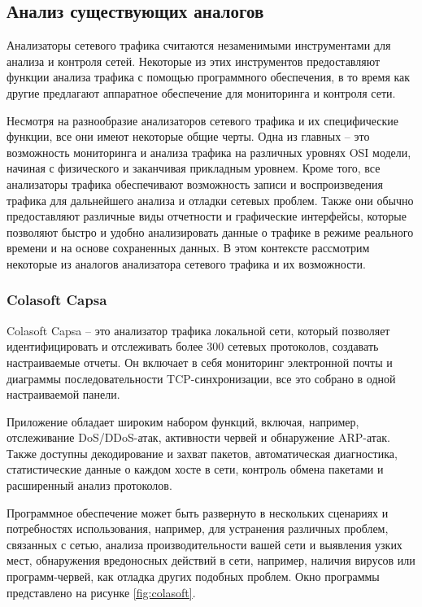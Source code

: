 \subsection{Анализ существующих аналогов}
\label{sec:analogs}

Анализаторы сетевого трафика считаются незаменимыми инструментами
для анализа и контроля сетей. Некоторые из этих инструментов предоставляют
функции анализа трафика с помощью программного обеспечения, в то время как
другие предлагают аппаратное обеспечение для мониторинга и контроля сети.


Несмотря на разнообразие анализаторов сетевого трафика и их
специфические функции, все они имеют некоторые общие черты. Одна из
главных -- это возможность мониторинга и анализа трафика на различных
уровнях OSI модели, начиная с физического и заканчивая прикладным уровнем.
Кроме того, все анализаторы трафика обеспечивают возможность записи и
воспроизведения трафика для дальнейшего анализа и отладки сетевых проблем.
Также они обычно предоставляют различные виды отчетности и графические
интерфейсы, которые позволяют быстро и удобно анализировать данные о
трафике в режиме реального времени и на основе сохраненных данных. В этом
контексте рассмотрим некоторые из аналогов анализатора сетевого трафика и их
возможности.


\subsubsection{Colasoft Capsa}
Colasoft Capsa -- это анализатор трафика локальной сети, который
позволяет идентифицировать и отслеживать более 300 сетевых протоколов,
создавать настраиваемые отчеты. Он включает в себя мониторинг электронной
почты и диаграммы последовательности TCP-синхронизации, все это собрано в
одной настраиваемой панели.


Приложение обладает широким набором функций, включая, например,
отслеживание DoS/DDoS-атак, активности червей и обнаружение ARP-атак. Также
доступны декодирование и захват пакетов, автоматическая диагностика,
статистические данные о каждом хосте в сети, контроль обмена пакетами и
расширенный анализ протоколов.


Программное обеспечение может быть развернуто в нескольких сценариях
и потребностях использования, например, для устранения различных проблем,
связанных с сетью, анализа производительности вашей сети и выявления узких
мест, обнаружения вредоносных действий в сети, например, наличия вирусов
или программ-червей, как отладка других подобных проблем. Окно программы
представлено на рисунке \ref{fig:colasoft}.

